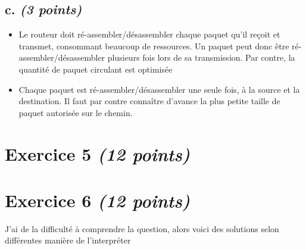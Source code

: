 \documentclass{article}
\begin{document}
\subsection{c. \emph{(3 points)}}
\begin{itemize}
    \item Le routeur doit ré-assembler/désassembler chaque paquet qu'il reçoit et transmet, consommant beaucoup de ressources. Un paquet peut donc être ré-assembler/désassembler plusieurs fois lors de sa transmission. Par contre, la quantité de paquet circulant est optimisée
    \item Chaque paquet est ré-assembler/désassembler une seule fois, à la source et la destination. Il faut par contre connaître d'avance la plus petite taille de paquet autorisée sur le chemin.
\end{itemize}

\clearpage

\section{Exercice 5 \emph{(12 points)}}



\clearpage

\section{Exercice 6 \emph{(12 points)}}
J'ai de la difficulté à comprendre la question, alors voici des solutions selon différentes manière de l'interpréter
\end{document}
